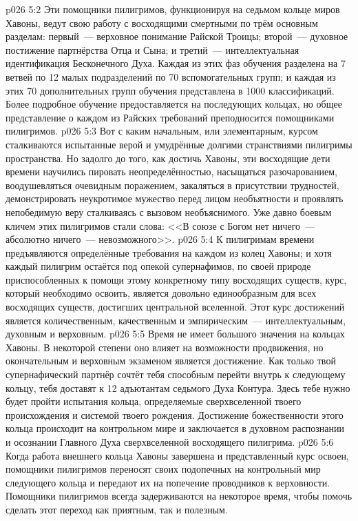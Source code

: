 \vs p026 5:2 Эти помощники пилигримов, функционируя на седьмом кольце миров Хавоны, ведут свою работу с восходящими смертными по трём основным разделам: первый~--- верховное понимание Райской Троицы; второй~--- духовное постижение партнёрства Отца и Сына; и третий~--- интеллектуальная идентификация Бесконечного Духа. Каждая из этих фаз обучения разделена на 7 ветвей по 12 малых подразделений по 70 вспомогательных групп; и каждая из этих 70 дополнительных групп обучения представлена в 1000 классификаций. Более подробное обучение предоставляется на последующих кольцах, но общее представление о каждом из Райских требований преподносится помощниками пилигримов.
\vs p026 5:3 Вот с каким начальным, или элементарным, курсом сталкиваются испытанные верой и умудрённые долгими странствиями пилигримы пространства. Но задолго до того, как достичь Хавоны, эти восходящие дети времени научились пировать неопределённостью, насыщаться разочарованием, воодушевляться очевидным поражением, закаляться в присутствии трудностей, демонстрировать неукротимое мужество перед лицом необъятности и проявлять непобедимую веру сталкиваясь с вызовом необъяснимого. Уже давно боевым кличем этих пилигримов стали слова: <<В союзе с Богом нет ничего~--- абсолютно ничего~--- невозможного>>.
\vs p026 5:4 К пилигримам времени предъявляются определённые требования на каждом из колец Хавоны; и хотя каждый пилигрим остаётся под опекой супернафимов, по своей природе приспособленных к помощи этому конкретному типу восходящих существ, курс, который необходимо освоить, является довольно единообразным для всех восходящих существ, достигших центральной вселенной. Этот курс достижений является количественным, качественным и эмпирическим~--- интеллектуальным, духовным и верховным.
\vs p026 5:5 Время не имеет большого значения на кольцах Хавоны. В некоторой степени оно влияет на возможности продвижения, но окончательным и верховным экзаменом является достижение. Как только твой супернафический партнёр сочтёт тебя способным перейти внутрь к следующему кольцу, тебя доставят к 12 адъютантам седьмого Духа Контура. Здесь тебе нужно будет пройти испытания кольца, определяемые сверхвселенной твоего происхождения и системой твоего рождения. Достижение божественности этого кольца происходит на контрольном мире и заключается в духовном распознании и осознании Главного Духа сверхвселенной восходящего пилигрима.
\vs p026 5:6 Когда работа внешнего кольца Хавоны завершена и представленный курс освоен, помощники пилигримов переносят своих подопечных на контрольный мир следующего кольца и передают их на попечение проводников к верховности. Помощники пилигримов всегда задерживаются на некоторое время, чтобы помочь сделать этот переход как приятным, так и полезным.
